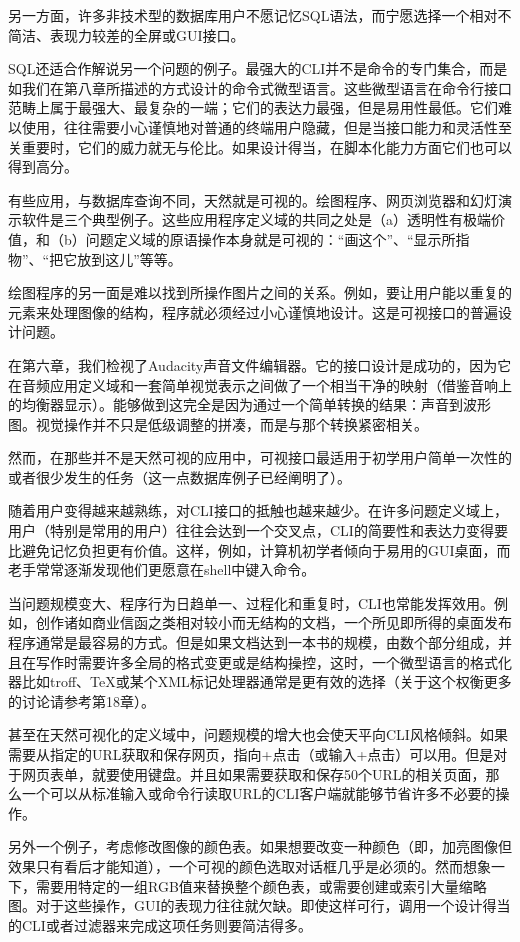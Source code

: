 \documentclass[12pt,oneside]{book}
\begin{document}
\begin{common-format}
另一方面，许多非技术型的数据库用户不愿记忆SQL语法，而宁愿选择一个相对不简洁、表现力较差的全屏或GUI接口。

SQL还适合作解说另一个问题的例子。最强大的CLI并不是命令的专门集合，而是如我们在第八章所描述的方式设计的命令式微型语言。这些微型语言在命令行接口范畴上属于最强大、最复杂的一端；它们的表达力最强，但是易用性最低。它们难以使用，往往需要小心谨慎地对普通的终端用户隐藏，但是当接口能力和灵活性至关重要时，它们的威力就无与伦比。如果设计得当，在脚本化能力方面它们也可以得到高分。

有些应用，与数据库查询不同，天然就是可视的。绘图程序、网页浏览器和幻灯演示软件是三个典型例子。这些应用程序定义域的共同之处是（a）透明性有极端价值，和（b）问题定义域的原语操作本身就是可视的：“画这个”、“显示所指物”、“把它放到这儿”等等。

绘图程序的另一面是难以找到所操作图片之间的关系。例如，要让用户能以重复的元素来处理图像的结构，程序就必须经过小心谨慎地设计。这是可视接口的普遍设计问题。

在第六章，我们检视了Audacity声音文件编辑器。它的接口设计是成功的，因为它在音频应用定义域和一套简单视觉表示之间做了一个相当干净的映射（借鉴音响上的均衡器显示）。能够做到这完全是因为通过一个简单转换的结果：声音到波形图。视觉操作并不只是低级调整的拼凑，而是与那个转换紧密相关。

然而，在那些并不是天然可视的应用中，可视接口最适用于初学用户简单一次性的或者很少发生的任务（这一点数据库例子已经阐明了）。

随着用户变得越来越熟练，对CLI接口的抵触也越来越少。在许多问题定义域上，用户（特别是常用的用户）往往会达到一个交叉点，CLI的简要性和表达力变得要比避免记忆负担更有价值。这样，例如，计算机初学者倾向于易用的GUI桌面，而老手常常逐渐发现他们更愿意在shell中键入命令。

当问题规模变大、程序行为日趋单一、过程化和重复时，CLI也常能发挥效用。例如，创作诸如商业信函之类相对较小而无结构的文档，一个所见即所得的桌面发布程序通常是最容易的方式。但是如果文档达到一本书的规模，由数个部分组成，并且在写作时需要许多全局的格式变更或是结构操控，这时，一个微型语言的格式化器比如troff、TeX或某个XML标记处理器通常是更有效的选择（关于这个权衡更多的讨论请参考第18章）。

甚至在天然可视化的定义域中，问题规模的增大也会使天平向CLI风格倾斜。如果需要从指定的URL获取和保存网页，指向+点击（或输入+点击）可以用。但是对于网页表单，就要使用键盘。并且如果需要获取和保存50个URL的相关页面，那么一个可以从标准输入或命令行读取URL的CLI客户端就能够节省许多不必要的操作。

另外一个例子，考虑修改图像的颜色表。如果想要改变一种颜色（即，加亮图像但效果只有看后才能知道），一个可视的颜色选取对话框几乎是必须的。然而想象一下，需要用特定的一组RGB值来替换整个颜色表，或需要创建或索引大量缩略图。对于这些操作，GUI的表现力往往就欠缺。即使这样可行，调用一个设计得当的CLI或者过滤器来完成这项任务则要简洁得多。


\end{common-format}
\end{document}
